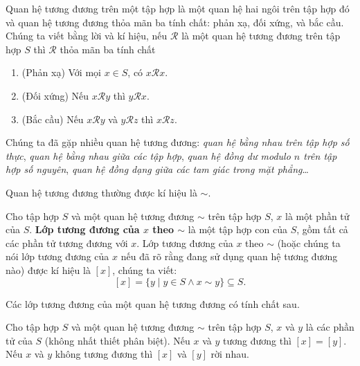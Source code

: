 \begin{definition}
    Quan hệ tương đương trên một tập hợp là một quan hệ hai ngôi trên tập hợp đó và quan hệ tương đương thỏa mãn ba tính chất: phản xạ, đối xứng, và bắc cầu. Chúng ta viết bằng lời và kí hiệu, nếu $\mathscr{R}$ là một quan hệ tương đương trên tập hợp $S$ thì $\mathscr{R}$ thỏa mãn ba tính chất
    \begin{enumerate}[label={(\roman*)}]
        \item (Phản xạ) Với mọi $x\in S$, có $x\mathscr{R}x$.
        \item (Đối xứng) Nếu $x\mathscr{R}y$ thì $y\mathscr{R}x$.
        \item (Bắc cầu) Nếu $x\mathscr{R}y$ và $y\mathscr{R}z$ thì $x\mathscr{R}z$.
    \end{enumerate}
\end{definition}

Chúng ta đã gặp nhiều quan hệ tương đương: \textit{quan hệ bằng nhau trên tập hợp số thực}, \textit{quan hệ bằng nhau giữa các tập hợp}, \textit{quan hệ đồng dư modulo $n$ trên tập hợp số nguyên}, \textit{quan hệ đồng dạng giữa các tam giác trong mặt phẳng}\ldots

Quan hệ tương đương thường được kí hiệu là $\sim$.

\begin{definition}
    Cho tập hợp $S$ và một quan hệ tương đương $\sim$ trên tập hợp $S$, $x$ là một phần tử của $S$. \@\textbf{Lớp tương đương của $x$ theo $\sim$} là một tập hợp con của $S$, gồm tất cả các phần tử tương đương với $x$. Lớp tương đương của $x$ theo $\sim$ (hoặc chúng ta nói lớp tương đương của $x$ nếu đã rõ rằng đang sử dụng quan hệ tương đương nào) được kí hiệu là $[x]$, chúng ta viết:
    \[
        [x] = \{ y \mid y\in S \wedge x\sim y \}\subseteq S.
    \]
\end{definition}

Các lớp tương đương của một quan hệ tương đương có tính chất sau.

\begin{theorem}
    Cho tập hợp $S$ và một quan hệ tương đương $\sim$ trên tập hợp $S$, $x$ và $y$ là các phần tử của $S$ (không nhất thiết phân biệt). Nếu $x$ và $y$ tương đương thì $[x] = [y]$. Nếu $x$ và $y$ không tương đương thì $[x]$ và $[y]$ rời nhau.
\end{theorem}

